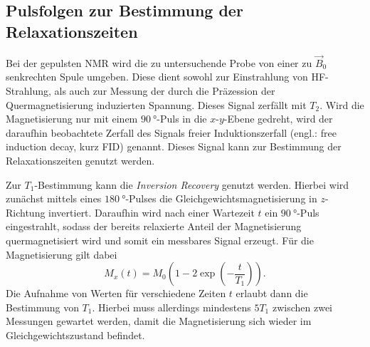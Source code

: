 \subsection{Pulsfolgen zur Bestimmung der Relaxationszeiten}
Bei der gepulsten NMR wird die zu untersuchende Probe von einer zu $\vec{B}_0$ senkrechten Spule umgeben. Diese dient sowohl zur Einstrahlung von HF-Strahlung, als auch zur Messung der durch die Präzession der Quermagnetisierung induzierten Spannung. Dieses Signal zerfällt mit $T_2$. Wird die Magnetisierung nur mit einem $\SI{90}{\degree}$-Puls in die $x$-$y$-Ebene gedreht, wird der daraufhin beobachtete Zerfall des Signals freier Induktionszerfall (engl.: free induction decay, kurz FID) genannt. Dieses Signal kann zur Bestimmung der Relaxationszeiten genutzt werden.

Zur $T_1$-Bestimmung kann die \textit{Inversion Recovery} genutzt werden. Hierbei wird zunächst mittels eines $\SI{180}{\degree}$-Pulses die Gleichgewichtsmagnetisierung in $z$-Richtung invertiert. Daraufhin wird nach einer Wartezeit $t$ ein $\SI{90}{\degree}$-Puls eingestrahlt, sodass der bereits relaxierte Anteil der Magnetisierung quermagnetisiert wird und somit ein messbares Signal erzeugt. Für die Magnetisierung gilt dabei
\begin{equation}
  M_x \left(t\right) = M_0 \left(1 - 2 \exp \left(-\frac{t}{T_1}\right)\right).
  \label{eq:T1}
\end{equation}
Die Aufnahme von Werten für verschiedene Zeiten $t$ erlaubt dann die Bestimmung von $T_1$. Hierbei muss allerdings mindestens $5T_1$ zwischen zwei Messungen gewartet werden, damit die Magnetisierung sich wieder im Gleichgewichtszustand befindet.

